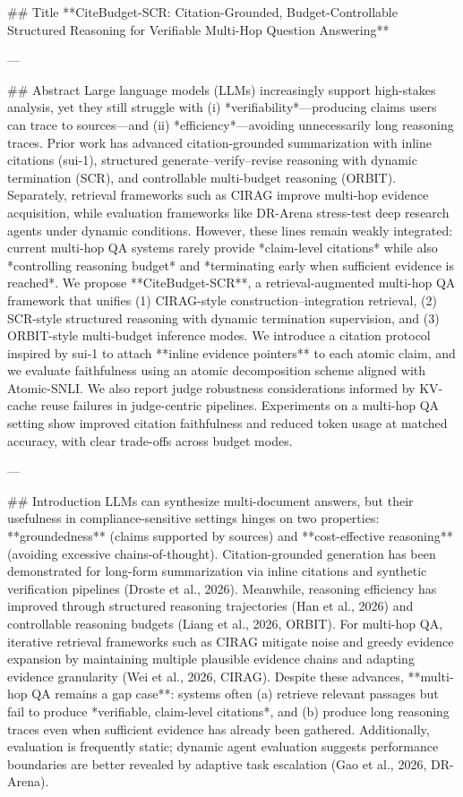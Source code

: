## Title  
**CiteBudget-SCR: Citation-Grounded, Budget-Controllable Structured Reasoning for Verifiable Multi-Hop Question Answering**

---

## Abstract  
Large language models (LLMs) increasingly support high-stakes analysis, yet they still struggle with (i) *verifiability*—producing claims users can trace to sources—and (ii) *efficiency*—avoiding unnecessarily long reasoning traces. Prior work has advanced citation-grounded summarization with inline citations (sui-1), structured generate–verify–revise reasoning with dynamic termination (SCR), and controllable multi-budget reasoning (ORBIT). Separately, retrieval frameworks such as CIRAG improve multi-hop evidence acquisition, while evaluation frameworks like DR-Arena stress-test deep research agents under dynamic conditions. However, these lines remain weakly integrated: current multi-hop QA systems rarely provide *claim-level citations* while also *controlling reasoning budget* and *terminating early when sufficient evidence is reached*.  
We propose **CiteBudget-SCR**, a retrieval-augmented multi-hop QA framework that unifies (1) CIRAG-style construction–integration retrieval, (2) SCR-style structured reasoning with dynamic termination supervision, and (3) ORBIT-style multi-budget inference modes. We introduce a citation protocol inspired by sui-1 to attach **inline evidence pointers** to each atomic claim, and we evaluate faithfulness using an atomic decomposition scheme aligned with Atomic-SNLI. We also report judge robustness considerations informed by KV-cache reuse failures in judge-centric pipelines. Experiments on a multi-hop QA setting show improved citation faithfulness and reduced token usage at matched accuracy, with clear trade-offs across budget modes.

---

## Introduction  
LLMs can synthesize multi-document answers, but their usefulness in compliance-sensitive settings hinges on two properties: **groundedness** (claims supported by sources) and **cost-effective reasoning** (avoiding excessive chains-of-thought). Citation-grounded generation has been demonstrated for long-form summarization via inline citations and synthetic verification pipelines (Droste et al., 2026). Meanwhile, reasoning efficiency has improved through structured reasoning trajectories (Han et al., 2026) and controllable reasoning budgets (Liang et al., 2026, ORBIT). For multi-hop QA, iterative retrieval frameworks such as CIRAG mitigate noise and greedy evidence expansion by maintaining multiple plausible evidence chains and adapting evidence granularity (Wei et al., 2026, CIRAG).  
Despite these advances, **multi-hop QA remains a gap case**: systems often (a) retrieve relevant passages but fail to produce *verifiable, claim-level citations*, and (b) produce long reasoning traces even when sufficient evidence has already been gathered. Additionally, evaluation is frequently static; dynamic agent evaluation suggests performance boundaries are better revealed by adaptive task escalation (Gao et al., 2026, DR-Arena).  

